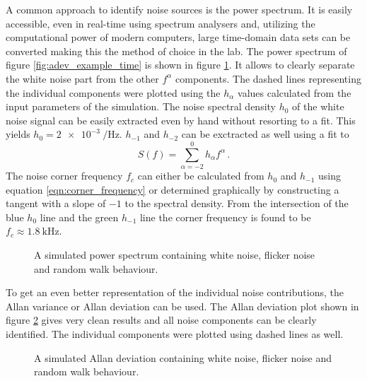 A common approach to identify noise sources is the power spectrum. It is easily accessible, even in real-time using spectrum analysers and, utilizing the computational power of modern computers, large time-domain data sets can be converted making this the method of choice in the lab. The power spectrum of figure \ref{fig:adev_example_time} is shown in figure \ref{fig:adev_example_psd}. It allows to clearly separate the white noise part from the other $f^{\alpha}$ components. The dashed lines representing the individual components were plotted using the $h_\alpha$ values calculated from the input parameters of the simulation. The noise spectral density $h_0$ of the white noise signal can be easily extracted even by hand without resorting to a fit. This yields $h_{0} = \qty{2e-3}{\per \Hz} $. $h_{-1}$ and $h_{-2}$ can be exctracted as well using a fit to
\begin{equation}
    S(f) = \sum_{\alpha = -2}^0 h_\alpha f^\alpha \, .
\end{equation}
The noise corner frequency $f_c$ can either be calculated from $h_0$ and $h_{-1}$ using equation \ref{eqn:corner_frequency} or determined graphically by constructing a tangent with a slope of $-1$ to the spectral density. From the intersection of the blue $h_0$ line and the green $h_{-1}$ line the corner frequency is found to be $f_c \approx \qty{1.8}{\kHz}$.

\begin{figure}[hb]
    \centering
    
    \caption{A simulated power spectrum containing white noise, flicker noise and random walk behaviour.}
    \label{fig:adev_example_psd}
\end{figure}

To get an even better representation of the individual noise contributions, the Allan variance or Allan deviation can be used. The Allan deviation plot shown in figure \ref{fig:adev_example_adev} gives very clean results and all noise components can be clearly identified. The individual components were plotted using dashed lines as well.

\begin{figure}[ht]
    \centering
    
    \caption{A simulated Allan deviation containing white noise, flicker noise and random walk behaviour.}
    \label{fig:adev_example_adev}
\end{figure}

